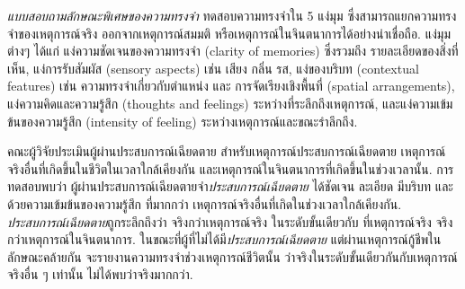 {\begin{shaded}
		
		
		\textit{แบบสอบถามลักษณะพิเศษของความทรงจำ} ทดสอบความทรงจำใน 5 แง่มุม 
		ซึ่งสามารถแยกความทรงจำของเหตุการณ์จริง ออกจากเหตุการณ์สมมติ หรือเหตุการณ์ในจินตนาการได้อย่างน่าเชื่อถือ.
		แง่มุมต่างๆ ได้แก่
		แง่ความชัดเจนของความทรงจำ (clarity of memories) ซึ่งรวมถึง รายละเอียดของสิ่งที่เห็น,
		แง่การรับสัมผัส (sensory aspects) เช่น เสียง กลิ่น รส,
		แง่ของบริบท (contextual features) เช่น ความทรงจำเกี่ยวกับตำแหน่ง และ การจัดเรียงเชิงพื้นที่ (spatial arrangements),
		แง่ความคิดและความรู้สึก (thoughts and feelings) ระหว่างที่ระลึกถึงเหตุการณ์,
		และแง่ความเข้มข้นของความรู้สึก (intensity of feeling) ระหว่างเหตุการณ์และขณะรำลึกถึง.
		
		
		คณะผู้วิจัยประเมินผู้ผ่านประสบการณ์เฉียดตาย สำหรับเหตุการณ์ประสบการณ์เฉียดตาย 
		เหตุการณ์จริงอื่นที่เกิดขึ้นในชีวิตในเวลาใกล้เคียงกัน
		และเหตุการณ์ในจินตนาการที่เกิดขึ้นในช่วงเวลานั้น.
		การทดสอบพบว่า ผู้ผ่านประสบการณ์เฉียดตายจำ\textit{ประสบการณ์เฉียดตาย} ได้ชัดเจน ละเอียด มีบริบท และด้วยความเข้มข้นของความรู้สึก
		ที่มากกว่า เหตุการณ์จริงอื่นที่เกิดในช่วงเวลาใกล้เคียงกัน.
		\textit{ประสบการณ์เฉียดตาย}ถูกระลึกถึงว่า จริงกว่าเหตุการณ์จริง
		ในระดับขั้นเดียวกับ ที่เหตุการณ์จริง จริงกว่าเหตุการณ์ในจินตนาการ.
		ในขณะที่ผู้ที่ไม่ได้มี\textit{ประสบการณ์เฉียดตาย} แต่ผ่านเหตุการณ์กู้ชีพในลักษณะคล้ายกัน 
		จะรายงานความทรงจำช่วงเหตุการณ์ชีวิตนั้น ว่าจริงในระดับขั้นเดียวกันกับเหตุการณ์จริงอื่น ๆ เท่านั้น ไม่ได้พบว่าจริงมากกว่า.
		

\end{shaded}}
